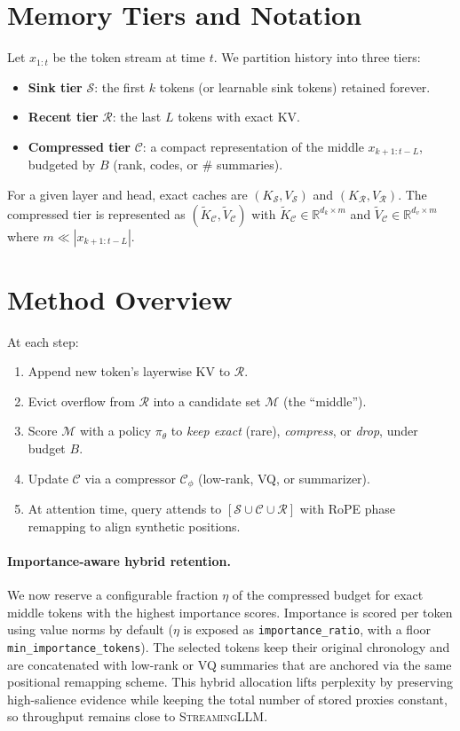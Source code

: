 \documentclass[11pt]{article}
\newcommand{\streaming}{\textsc{StreamingLLM}}
\newcommand{\kv}{KV}
\newcommand{\sink}{\mathcal{S}}
\newcommand{\recent}{\mathcal{R}}
\newcommand{\compressed}{\mathcal{C}}
\begin{document}
\section{Memory Tiers and Notation}
Let $x_{1:t}$ be the token stream at time $t$. We partition history into three tiers:
\begin{itemize}
  \item \textbf{Sink tier} $\sink$: the first $k$ tokens (or learnable sink tokens) retained forever.
  \item \textbf{Recent tier} $\recent$: the last $L$ tokens with exact \kv{}.
  \item \textbf{Compressed tier} $\compressed$: a compact representation of the middle $x_{k+1:t-L}$, budgeted by $B$ (rank, codes, or \# summaries).
\end{itemize}
For a given layer and head, exact caches are $(K_{\sink}, V_{\sink})$ and $(K_{\recent}, V_{\recent})$. The compressed tier is represented as $(\tilde K_{\compressed}, \tilde V_{\compressed})$ with $\tilde K_{\compressed} \in \mathbb{R}^{d_k \times m}$ and $\tilde V_{\compressed} \in \mathbb{R}^{d_v \times m}$ where $m \ll |x_{k+1:t-L}|$.

\section{Method Overview}
At each step:
\begin{enumerate}
  \item Append new token's layerwise \kv{} to $\recent$.
  \item Evict overflow from $\recent$ into a candidate set $\mathcal{M}$ (the ``middle'').
  \item Score $\mathcal{M}$ with a policy $\pi_\theta$ to \emph{keep exact} (rare), \emph{compress}, or \emph{drop}, under budget $B$.
  \item Update $\compressed$ via a compressor $\mathcal{C}_\phi$ (low-rank, VQ, or summarizer).
  \item At attention time, query attends to $[\sink \cup \compressed \cup \recent]$ with RoPE phase remapping to align synthetic positions.
\end{enumerate}

\paragraph{Importance-aware hybrid retention.}
We now reserve a configurable fraction $\eta$ of the compressed budget for exact
middle tokens with the highest importance scores. Importance is scored per token
using value norms by default ($\eta$ is exposed as \texttt{importance\_ratio},
with a floor \texttt{min\_importance\_tokens}). The selected tokens keep their
original chronology and are concatenated with low-rank or VQ summaries that are
anchored via the same positional remapping scheme. This hybrid allocation lifts
perplexity by preserving high-salience evidence while keeping the total number
of stored proxies constant, so throughput remains close to \streaming{}.
\end{document}
